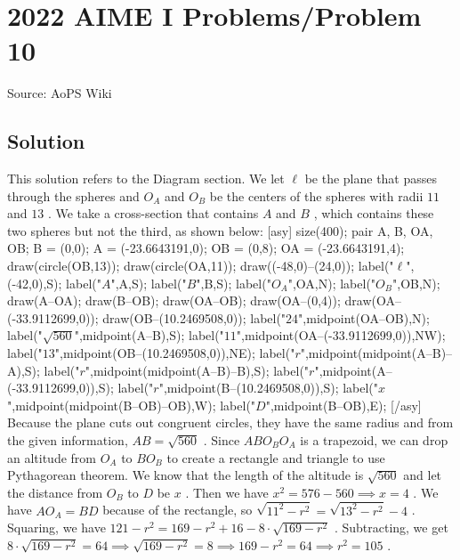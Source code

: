 \documentclass[12pt]{article}
\begin{document}
\section*{{2022 AIME I Problems/Problem 10}}
Source: AoPS Wiki

\subsection*{Solution}
This solution refers to the Diagram section. We let $\ell$ be the plane that passes through the spheres and $O_A$ and $O_B$ be the centers of the spheres with radii $11$ and $13$ . We take a cross-section that contains $A$ and $B$ , which contains these two spheres but not the third, as shown below: [asy] size(400); pair A, B, OA, OB; B = (0,0); A = (-23.6643191,0); OB = (0,8); OA = (-23.6643191,4); draw(circle(OB,13)); draw(circle(OA,11)); draw((-48,0)--(24,0)); label("$\ell$",(-42,0),S); label("$A$",A,S); label("$B$",B,S); label("$O_A$",OA,N); label("$O_B$",OB,N); draw(A--OA); draw(B--OB); draw(OA--OB); draw(OA--(0,4)); draw(OA--(-33.9112699,0)); draw(OB--(10.2469508,0)); label("$24$",midpoint(OA--OB),N); label("$\sqrt{560}$",midpoint(A--B),S); label("$11$",midpoint(OA--(-33.9112699,0)),NW); label("$13$",midpoint(OB--(10.2469508,0)),NE); label("$r$",midpoint(midpoint(A--B)--A),S); label("$r$",midpoint(midpoint(A--B)--B),S); label("$r$",midpoint(A--(-33.9112699,0)),S); label("$r$",midpoint(B--(10.2469508,0)),S); label("$x$",midpoint(midpoint(B--OB)--OB),W); label("$D$",midpoint(B--OB),E); [/asy] Because the plane cuts out congruent circles, they have the same radius and from the given information, $AB = \sqrt{560}$ . Since $ABO_BO_A$ is a trapezoid, we can drop an altitude from $O_A$ to $BO_B$ to create a rectangle and triangle to use Pythagorean theorem. We know that the length of the altitude is $\sqrt{560}$ and let the distance from $O_B$ to $D$ be $x$ . Then we have $x^2 = 576-560 \implies x = 4$ . We have $AO_A = BD$ because of the rectangle, so $\sqrt{11^2-r^2} = \sqrt{13^2-r^2}-4$ .
Squaring, we have $121-r^2 = 169-r^2 + 16 - 8 \cdot \sqrt{169-r^2}$ .
Subtracting, we get $8 \cdot \sqrt{169-r^2} = 64 \implies \sqrt{169-r^2} = 8 \implies 169-r^2 = 64 \implies r^2 = 105$ .
\end{document}
